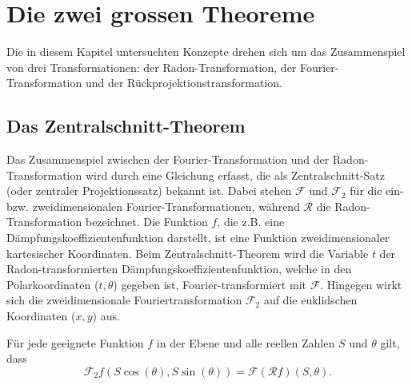 %
%
%
%
\section{Die zwei grossen Theoreme
	\label{ct:section:theoreme}}
Die in diesem Kapitel untersuchten Konzepte drehen sich um das Zusammenspiel von drei Transformationen: der Radon-Transformation, der Fourier-Transformation und der Rückprojektionstransformation.

\subsection{Das Zentralschnitt-Theorem
	\label{ct:subsection:zentralschnitt}}
Das Zusammenspiel zwischen der Fourier-Transformation und der Radon-Transformation wird durch eine Gleichung erfasst, die als Zentralschnitt-Satz (oder zentraler Projektionssatz) bekannt ist. Dabei stehen $\mathscr{F}$ und $\mathscr{F}_2$ für die ein- bzw. zweidimensionalen Fourier-Transformationen, während $\mathscr{R}$ die Radon-Transformation bezeichnet. Die Funktion $f$, die z.B. eine Dämpfungskoeffizientenfunktion darstellt, ist eine Funktion zweidimensionaler kartesischer Koordinaten.
Beim Zentralschnitt-Theorem wird die Variable $t$ der Radon-transformierten Dämpfungskoeffizientenfunktion, welche in den Polarkoordinaten ($t, \theta$) gegeben ist, Fourier-transformiert mit $\mathscr{F}$. 
Hingegen wirkt sich die zweidimensionale Fouriertransformation  $\mathscr{F}_2$ auf die euklidschen Koordinaten ($x, y$) aus.

\begin{satz}
%
Für jede geeignete Funktion $f$ in der Ebene und alle reellen Zahlen $S$ und $\theta$ gilt, dass
	\begin{equation}\label{2dFourier1}
		\mathscr{F}_2f(S\cos(\theta), S\sin(\theta)) = \mathscr{F}(\mathscr{R}f)(S, \theta).
	\end{equation}
\end{satz}

